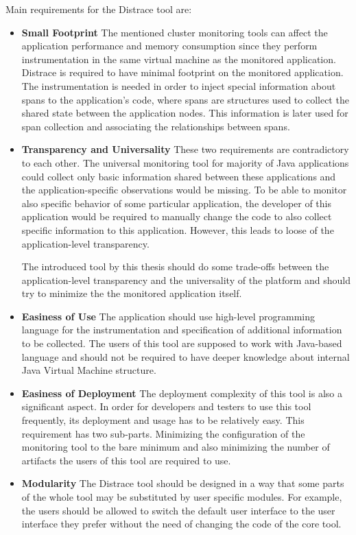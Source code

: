 Main requirements for the Distrace tool are:
\begin{itemize}
	\item \textbf{Small Footprint} \newline
	 The mentioned cluster monitoring tools can affect the application performance and memory consumption since they perform instrumentation in the same virtual machine as the monitored application. Distrace is required to have minimal footprint on the monitored application. The instrumentation is needed in order to inject special information about spans to the application's code, where spans are structures used to collect the shared state between the application nodes. This information is later used for span collection and associating the relationships between spans.
	\item \textbf{Transparency and Universality} \newline
	These two requirements are contradictory to each other. The universal monitoring tool for majority of Java applications could collect only basic information shared between these applications and the application-specific observations would be missing. To be able to monitor also specific behavior of some particular application, the developer of this application would be required to manually change the code to also collect specific information to this application. However, this leads to loose of the application-level transparency. 
	
	The introduced tool by this thesis should do some trade-offs between the application-level transparency and the universality of the platform and should try to minimize the the monitored application itself.
	
	\item \textbf{Easiness of Use} \newline
	The application should use high-level programming language for the instrumentation and specification of additional information to be collected. The users of this tool are supposed to work with Java-based language and should not be required to have deeper knowledge about internal Java Virtual Machine structure.
	\item \textbf{Easiness of Deployment} \newline
	The deployment complexity of this tool is also a significant aspect. In order for developers and testers to use this tool frequently, its deployment and usage has to be relatively easy. This requirement has two sub-parts. Minimizing the configuration of the monitoring tool to the bare minimum and also minimizing the number of artifacts the users of this tool are required to use.
	\item \textbf{Modularity} \newline
	The Distrace tool should be designed in a way that some parts of the whole tool may be substituted by user specific modules. For example, the users should be allowed to switch the default user interface to the user interface they prefer without the need of changing the code of the core tool.
\end{itemize}

